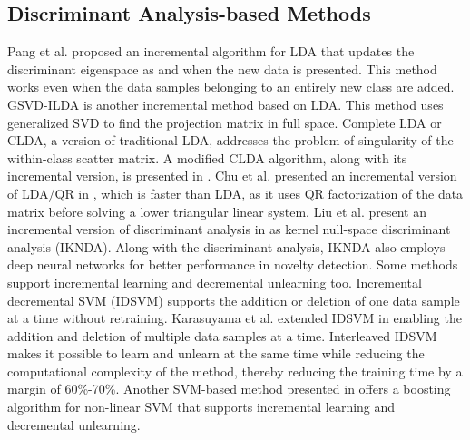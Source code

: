 \subsection{Discriminant Analysis-based Methods}
\label{subs:Lit_Inc_DA}
Pang et al. \cite{PangOK05} proposed an incremental algorithm for LDA that updates the discriminant eigenspace as and when the new data is presented. This method works even when the data samples belonging to an entirely new class are added. GSVD-ILDA \cite{ZhaoY07} is another incremental method based on LDA. This method uses generalized SVD to find the projection matrix in full space. Complete LDA or CLDA, a version of traditional LDA, addresses the problem of singularity of the within-class scatter matrix. A modified CLDA algorithm, along with its incremental version, is presented in \cite{LuZW12}. Chu et al. presented an incremental version of LDA/QR in \cite{ChuLNW15}, which is faster than LDA, as it uses QR factorization of the data matrix before solving a lower triangular linear system. Liu et al. present an incremental version of discriminant analysis in \cite{LiuLWX17} as kernel null-space discriminant analysis (IKNDA). Along with the discriminant analysis, IKNDA also employs deep neural networks for better performance in novelty detection. Some methods \cite{CauwenberghsP00, KarasuyamaT10, SirkunanSM19, Kashef21} support incremental learning and decremental unlearning too. Incremental decremental SVM (IDSVM) \cite{CauwenberghsP00} supports the addition or deletion of one data sample at a time without retraining. Karasuyama et al. extended IDSVM in \cite{KarasuyamaT10} enabling the addition and deletion of multiple data samples at a time. Interleaved IDSVM \cite{SirkunanSM19} makes it possible to learn and unlearn at the same time while reducing the computational complexity of the method, thereby reducing the training time by a margin of 60\%-70\%. Another SVM-based method presented in \cite{Kashef21} offers a boosting algorithm for non-linear SVM that supports incremental learning and decremental unlearning.





